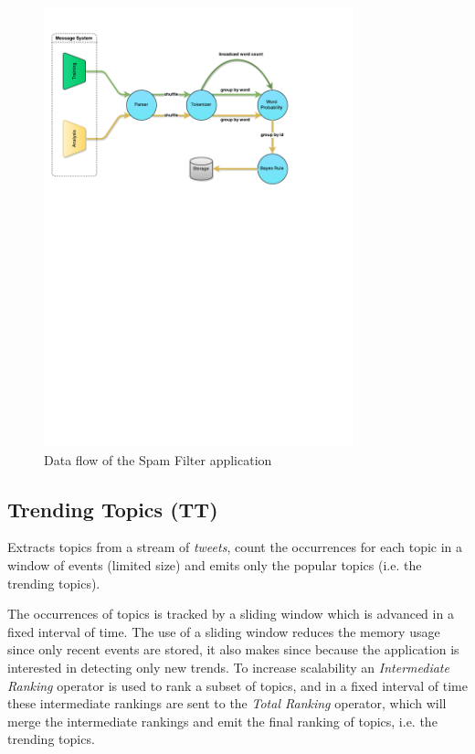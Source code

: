 \documentclass[ppgc,diss,english]{iiufrgs}
\begin{document}
\begin{figure}[!ht]
	\centering
	\includegraphics[width=0.8\textwidth]{images/apps/SpamFilter.pdf}
	\caption{Data flow of the Spam Filter application}
	\label{fig:app_spam_filter}
\end{figure}

\subsection{Trending Topics (TT)}

Extracts topics from a stream of \textit{tweets}, count the occurrences for each topic in a window of events (limited size) and emits only the popular topics (i.e. the trending topics).

The occurrences of topics is tracked by a sliding window which is advanced in a fixed interval of time. The use of a sliding window reduces the memory usage since only recent events are stored, it also makes since because the application is interested in detecting only new trends. To increase scalability an \emph{Intermediate Ranking} operator is used to rank a subset of topics, and in a fixed interval of time these intermediate rankings are sent to the \emph{Total Ranking} operator, which will merge the intermediate rankings and emit the final ranking of topics, i.e. the trending topics.
\end{document}
